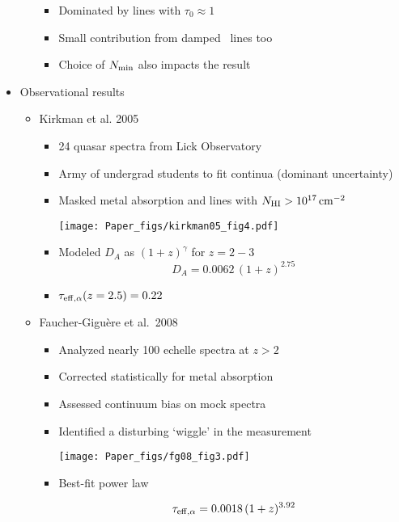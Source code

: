 \documentclass[12pt,letterpaper]{article}
\begin{document}
\begin{Aenumerate}
\begin{itemize}
\begin{itemize}
			\begin{itemize}
			\item Dominated by lines with $\tau_0 \approx 1$
			\item Small contribution from damped \lya\ lines too
			\item Choice of $N_{\rm min}$ also impacts the result
			\end{itemize}

		\end{itemize}

	\item Observational results
		\begin{itemize}
		\item Kirkman et al. 2005
			\begin{itemize}
			\item 24 quasar spectra from Lick Observatory
			\item Army of undergrad students to fit continua 
			(dominant uncertainty)
			\item Masked metal absorption and lines with $N_{\rm HI} > 10^{17} \, {\rm cm^{-2}}$

	\texttt{[image: Paper\_figs/kirkman05\_fig4.pdf]}

			\item Modeled $D_A$ as $(1+z)^\gamma$ for $z=2-3$
			\begin{equation}
			D_A = 0.0062 \, (1+z)^{2.75}
			\end{equation}
			\item $\tau_{\rm eff, \alpha}(z=2.5) = 0.22$ 
			\end{itemize}
		\item Faucher-Gigu\`ere et al.\ 2008
			\begin{itemize}
			\item Analyzed nearly 100 echelle spectra at $z>2$
			\item Corrected statistically for metal absorption
			\item Assessed continuum bias on mock spectra
			\item Identified a disturbing `wiggle' in the measurement

	\texttt{[image: Paper\_figs/fg08\_fig3.pdf]}

			\item Best-fit power law

			\begin{equation}
			\tau_{\rm eff, \alpha} = 0.0018 \, (1+z)^{3.92}
			\end{equation}


\end{itemize}
\end{itemize}
\end{itemize}
\end{Aenumerate}
\end{document}
